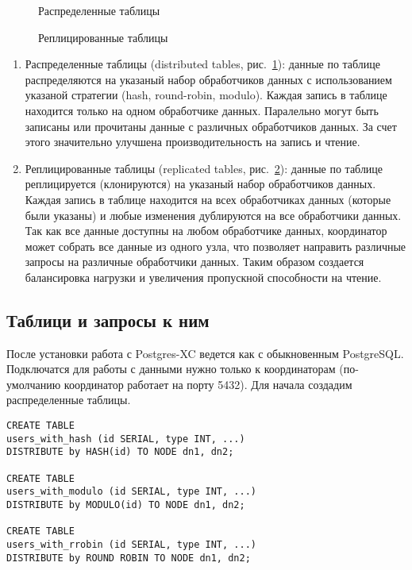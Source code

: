 \begin{figure}[ht!]
  \caption{Распределенные таблицы}
  \label{fig:postgres-xc2}
\end{figure}

\begin{figure}[ht!]
  \caption{Реплицированные таблицы}
  \label{fig:postgres-xc3}
\end{figure}

\begin{enumerate}
\item Распределенные таблицы (distributed tables, рис.~\ref{fig:postgres-xc2}): данные по таблице распределяются на указаный набор обработчиков данных с использованием указаной стратегии (hash, round-robin, modulo). Каждая запись в таблице находится только на одном обработчике данных. Паралельно могут быть записаны или прочитаны данные с различных обработчиков данных. За счет этого значительно улучшена производительность на запись и чтение.
\item Реплицированные таблицы (replicated tables, рис.~\ref{fig:postgres-xc3}): данные по таблице реплицируется (клонируются) на указаный набор обработчиков данных. Каждая запись в таблице находится на всех обработчиках данных (которые были указаны) и любые изменения дублируются на все обработчики данных. Так как все данные доступны на любом обработчике данных, координатор может собрать все данные из одного узла, что позволяет направить различные запросы на различные обработчики данных. Таким образом создается балансировка нагрузки и увеличения пропускной способности на чтение.
\end{enumerate}

\subsection{Таблици и запросы к ним}

После установки работа с Postgres-XC ведется как с обыкновенным PostgreSQL. Подключатся для работы с данными нужно только к координаторам (по-умолчанию координатор работает на порту 5432). Для начала создадим распределенные таблицы.

\begin{lstlisting}[label=lst:postgres-xc2,caption=Создание распределенных таблиц]
CREATE TABLE 
users_with_hash (id SERIAL, type INT, ...) 
DISTRIBUTE by HASH(id) TO NODE dn1, dn2;

CREATE TABLE 
users_with_modulo (id SERIAL, type INT, ...) 
DISTRIBUTE by MODULO(id) TO NODE dn1, dn2;

CREATE TABLE 
users_with_rrobin (id SERIAL, type INT, ...) 
DISTRIBUTE by ROUND ROBIN TO NODE dn1, dn2;
\end{lstlisting}

